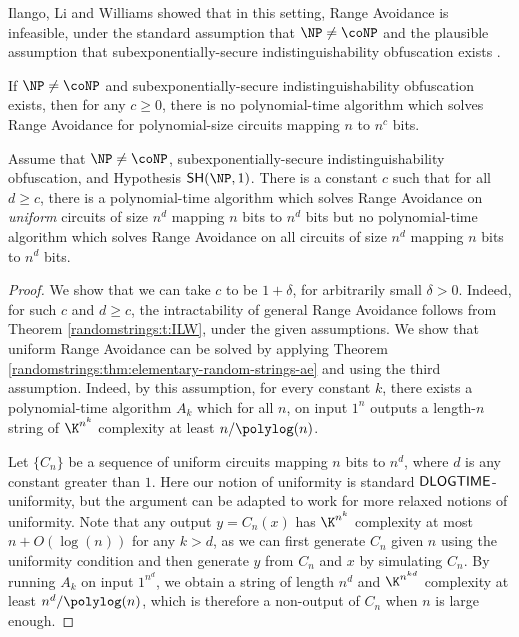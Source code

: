 Ilango, Li and Williams \cite{ILW23} showed that in this setting, Range Avoidance is infeasible, under the standard assumption that $\NP \neq \coNP$ and the plausible assumption that subexponentially-secure indistinguishability obfuscation exists \cite{JLS21}.

\begin{theorem}
\label{randomstrings:t:ILW} \cite{ILW23}
If $\NP \neq \coNP$ and subexponentially-secure indistinguishability obfuscation exists, then for any $c \geq 0$, there is no polynomial-time algorithm which solves Range Avoidance for polynomial-size circuits mapping $n$ to $n^c$ bits.
\end{theorem}

\begin{corollary}
\label{randomstrings:c:UnifvsNonunifP}
Assume that $\NP \neq \coNP$, subexponentially-secure indistinguishability obfuscation, and Hypothesis $\SH(\NP,1)$. There is a constant $c$ such that for all $d \geq c$, there is a polynomial-time algorithm which solves Range Avoidance on {\it uniform} circuits of size $n^d$ mapping $n$ bits to $n^d$ bits but no polynomial-time algorithm which solves Range Avoidance on all circuits of size $n^d$ mapping $n$ bits to $n^d$ bits.
\end{corollary}

\begin{proof}
We show that we can take $c$ to be $1+\delta$, for arbitrarily small $\delta > 0$. Indeed, for such $c$ and $d \geq c$, the intractability of general Range Avoidance follows from Theorem \ref{randomstrings:t:ILW}, under the given assumptions. We show that uniform Range Avoidance can be solved by applying Theorem \ref{randomstrings:thm:elementary-random-strings-ae} and using the third assumption. Indeed, by this assumption, for every constant $k$, there exists a polynomial-time algorithm $A_k$ which for all $n$, on input $1^n$ outputs a length-$n$ string of $\K^{n^k}$ complexity at least $n/\polylog(n)$.

Let $\{C_n\}$ be a sequence of uniform circuits mapping $n$ bits to $n^d$, where $d$ is any constant greater than $1$. Here our notion of uniformity is standard $\mathsf{DLOGTIME}$-uniformity, but the argument can be adapted to work for more relaxed notions of uniformity. Note that any output $y = C_n(x)$ has $\K^{n^k}$ complexity at most $n+O(\log(n))$ for any $k > d$, as we can first generate $C_n$ given $n$ using the uniformity condition and then generate $y$ from $C_n$ and $x$ by simulating $C_n$.  By running $A_k$ on input $1^{n^d}$, we obtain a string of length $n^d$ and $\K^{n^{kd}}$ complexity at least $n^d/\polylog(n)$, which is therefore a non-output of $C_n$ when $n$ is large enough.
\end{proof}

